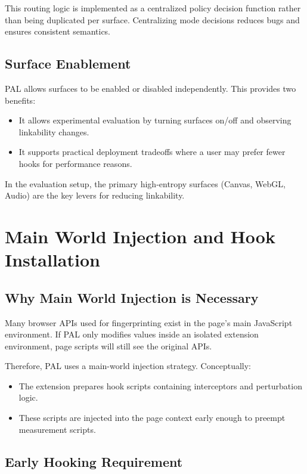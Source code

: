 \documentclass[11pt]{report}
\begin{document}
This routing logic is implemented as a centralized policy decision function rather than being duplicated per surface. Centralizing mode decisions reduces bugs and ensures consistent semantics.

\subsection{Surface Enablement}

PAL allows surfaces to be enabled or disabled independently. This provides two benefits:

\begin{itemize}
    \item It allows experimental evaluation by turning surfaces on/off and observing linkability changes.
    \item It supports practical deployment tradeoffs where a user may prefer fewer hooks for performance reasons.
\end{itemize}

In the evaluation setup, the primary high-entropy surfaces (Canvas, WebGL, Audio) are the key levers for reducing linkability.

\section{Main World Injection and Hook Installation}

\subsection{Why Main World Injection is Necessary}

Many browser APIs used for fingerprinting exist in the page’s main JavaScript environment. If PAL only modifies values inside an isolated extension environment, page scripts will still see the original APIs.

Therefore, PAL uses a main-world injection strategy. Conceptually:

\begin{itemize}
    \item The extension prepares hook scripts containing interceptors and perturbation logic.
    \item These scripts are injected into the page context early enough to preempt measurement scripts.
\end{itemize}

\subsection{Early Hooking Requirement}
\end{document}
